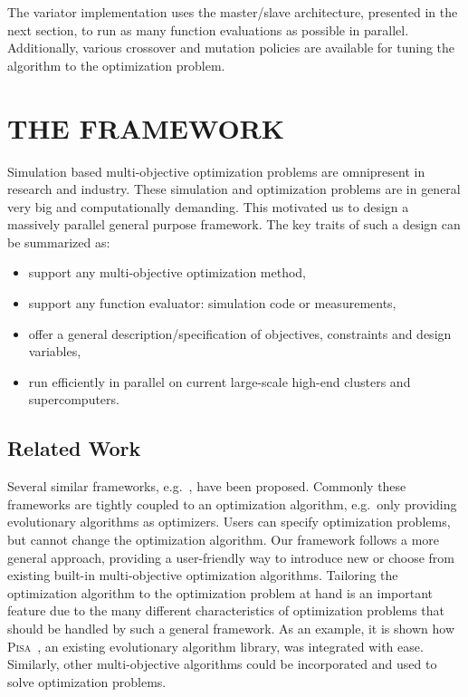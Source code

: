 \documentclass[preprint,linenumbers,amsmath,amssymb,aps,prstab]{revtex4-1}%
\begin{document}
The variator implementation uses the master/slave architecture, presented in
  the next section, to run as many function evaluations as possible in parallel.
Additionally, various crossover and mutation policies are available for tuning
  the algorithm to the optimization problem.



\section{THE FRAMEWORK} \label{sec:framework}

Simulation based multi-objective optimization problems are omnipresent in
  research and industry.
These simulation and optimization problems are in
  general very big and computationally demanding.
This motivated us to design a massively parallel general purpose framework.
The key traits of such a design can be summarized as:
%
\begin{itemize}
  \item support any multi-objective optimization method,
  \item support any function evaluator: simulation code or measurements,
  \item offer a general description/specification of objectives, constraints
        and design variables,
  \item run efficiently in parallel on current large-scale high-end clusters
        and supercomputers.
\end{itemize}
%

\subsection{Related Work}

Several similar frameworks, e.g.~\cite{fide:09,lems:09,lbjt:07,dnld:06}, have
  been proposed.
Commonly these frameworks are tightly coupled to an optimization algorithm,
  e.g.\ only providing evolutionary algorithms as optimizers.
Users can specify optimization problems, but cannot change the
  optimization algorithm.
Our framework follows a more general approach, providing a user-friendly way
  to introduce new or choose from existing built-in multi-objective
  optimization algorithms.
Tailoring the optimization algorithm to the optimization problem at hand is
  an important feature due to the many different characteristics of
  optimization problems that should be handled by such a general framework.
As an example, it is shown how \textsc{Pisa}~\cite{pisa}, an existing evolutionary
  algorithm library, was integrated with ease.
Similarly, other multi-objective algorithms could be incorporated and
  used to solve optimization problems.
\end{document}
